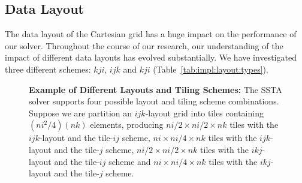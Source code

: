 \documentclass[10pt, conference, compsocconf]{IEEEtran}
\begin{document}
\subsection{Data Layout}
\label{sec:impl:data_layout}

The data layout of the Cartesian grid has a huge impact on the performance
  of our solver.
Throughout the course of our research, our understanding of the impact of
  different data layouts has evolved substantially.
We have investigated three different schemes: \(kji\), \(ijk\) and \(kji\)
  (Table~\ref{tab:impl:layout:types}).

\begin{figure}[!bth]
  \centering
  \caption{
    \textbf{Example of Different Layouts and Tiling Schemes:}
      The SSTA solver supports four possible layout and tiling scheme combinations.
      Suppose we are partition an \(ijk\)-layout grid into tiles containing
        \((ni^2/4)(nk)\) elements, producing 
        \(ni/2 \times ni/2 \times nk\) tiles with the \(ijk\)-layout and the
          tile-\(ij\) scheme,
        \(ni \times ni/4 \times nk\) tiles with the \(ijk\)-layout and the
          tile-\(j\) scheme,
        \(ni/2 \times ni/2 \times nk\) tiles with the \(ikj\)-layout and the
          tile-\(ij\) scheme and
        \(ni \times ni/4 \times nk\) tiles with the \(ikj\)-layout and the
          tile-\(j\) scheme.
  }
  \label{fig:impl:tiling_schemes}
  \begin{minipage}{0.49\textwidth}
    \centering
\end{minipage}
\end{figure}
\end{document}
